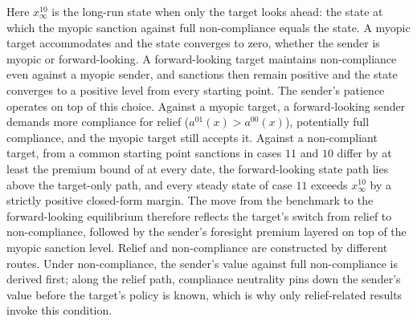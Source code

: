  Here $x^{10}_\infty$ is the long-run state when only the target looks ahead:
the state at which the myopic sanction against full non-compliance equals the state. A myopic target accommodates and the state converges to zero, whether the
sender is myopic or forward-looking. A forward-looking target maintains non-compliance
even against a myopic sender, and sanctions then remain positive and the state
converges to a positive level from every starting point. The sender's patience
operates on top of this choice. Against a myopic target, a forward-looking sender
demands more compliance for relief ($a^{01}(x)>a^{00}(x)$), potentially full
compliance, and the myopic target still accepts it. Against a non-compliant target,
from a common starting point sanctions in cases $11$ and $10$ differ by at least the
premium bound of  at every date, the forward-looking state path
lies above the target-only path, and every steady state of case $11$ exceeds
$x^{10}_\infty$ by a strictly positive closed-form margin. The move from the benchmark
to the forward-looking equilibrium therefore reflects the target's switch from relief
to non-compliance, followed by the sender's foresight premium layered on top of the myopic sanction level. Relief and non-compliance are constructed by different routes. Under
non-compliance, the sender's value against full non-compliance is derived first; along the relief path, compliance neutrality pins down the sender's value before the target's policy is
known, which is why only relief-related results invoke this condition.

